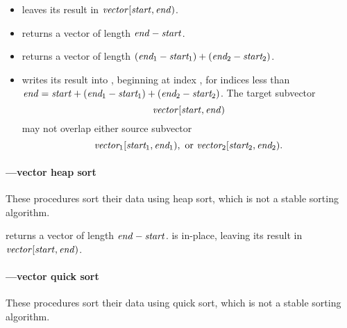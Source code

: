 \begin{itemize}
\item 
{} leaves its result in
\(\textnormal{\textit{vector}}[\textnormal{\textit{start}},\textnormal{\textit{end}})\).
\item   
{} returns a vector of length
\(\textnormal{\textit{end}}-\textnormal{\textit{start}}\).
\item 
{} returns a vector of length
\((\textnormal{\textit{end$_1$}}-\textnormal{\textit{start$_1$}})+(\textnormal{\textit{end$_2$}}-\textnormal{\textit{start$_2$}})\).
\item 
{} writes its result into , beginning
at index ,
for indices less than \(\textnormal{\textit{end}} =\textnormal{\textit{start}} +
(\textnormal{\textit{end$_1$}}-\textnormal{\textit{start$_1$}}) + (\textnormal{\textit{end$_2$}}-\textnormal{\textit{start$_2$}})\).
The target subvector
\[\textnormal{\textit{vector}}[\textnormal{\textit{start}},\textnormal{\textit{end}})\]
may not overlap either source subvector
\[\textnormal{\textit{vector$_1$}}[\textnormal{\textit{start$_1$}},\textnormal{\textit{end$_1$}}), \textrm{ or }
\textnormal{\textit{vector$_2$}}[\textnormal{\textit{start$_2$}},\textnormal{\textit{end$_2$}}).\]
\end{itemize}

\paragraph{---vector heap sort}

\begin{protos}
\end{protos}
%
These procedures sort their data using heap sort, 
which is not a stable sorting algorithm.
    
 returns a vector of length \(\textnormal{\textit{end}}-\textnormal{\textit{start}}\). 
 is in-place, leaving its result in
\(\textnormal{\textit{vector}}[\textnormal{\textit{start}},\textnormal{\textit{end}})\).

\paragraph{---vector quick sort}

\begin{protos}
\end{protos}
%
These procedures sort their data using quick sort, 
which is not a stable sorting algorithm.
    
